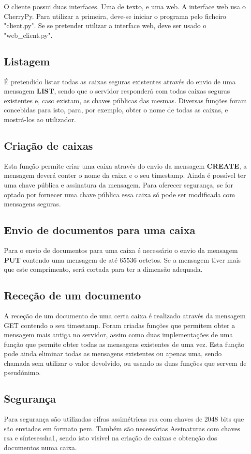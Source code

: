 \documentclass{report}
\begin{document}
O cliente possui duas interfaces. Uma de texto, e uma web. A interface web usa o CherryPy. Para utilizar a primeira, deve-se iniciar o programa pelo ficheiro "client.py". Se se pretender utilizar a interface web, deve ser usado o "web_client.py".

\subsection{Listagem}
É pretendido listar todas as caixas seguras existentes através do envio de uma mensagem \textbf{LIST}, sendo que o servidor responderá com todas caixas seguras existentes e, caso existam, as chaves públicas das mesmas. Diversas funções foram concebidas para isto, para, por exemplo, obter o nome de todas as caixas, e mostrá-los ao utilizador.


\subsection{Criação de caixas}
Esta função permite criar uma caixa através do envio da mensagem \textbf{CREATE}, a mensagem deverá conter o nome da caixa e o seu timestamp. Ainda é possível ter uma chave pública e assinatura da mensagem. Para oferecer segurança, se for optado por fornecer uma chave pública essa caixa só pode ser modificada com mensagens seguras.


\subsection{Envio de documentos para uma caixa}
Para o envio de documentos para uma caixa é necessário o envio da mensagem \textbf{PUT} contendo uma mensagem de até 65536 octetos. Se a mensagem tiver mais que este comprimento, será cortada para ter a dimensão adequada.


\subsection{Receção de um documento}
A receção de um documento de uma certa caixa é realizado através da mensagem GET contendo o seu timestamp. Foram criadas funções que permitem obter a mensagem mais antiga no servidor, assim como duas implementações de uma função que permite obter todas as mensagens existentes de uma vez. Esta função pode ainda eliminar todas as mensagens existentes ou apenas uma, sendo chamada sem utilizar o valor devolvido, ou usando as duas funções que servem de pseudónimo.


\subsection{Segurança}
Para segurança são utilizadas cifras assimétricas \ac{rsa} com chaves de 2048 bits que são enviadas em formato \ac{pem}. Também são necessárias Assinaturas com chaves \ac{rsa} e sínteses{sha1}, sendo isto visível na criação de caixas e obtenção dos documentos numa caixa.
\end{document}
